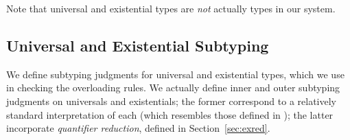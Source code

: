 \documentclass[10pt]{sigplanconf}
\newcommand{\subtypeof}{\ensuremath{<:}}
\newcommand{\ob}[1]{\ensuremath{\llbracket {#1} \rrbracket}}
\begin{document}
Note that universal and existential types 
are \emph{not} actually types in our system.

\subsection{Universal and Existential Subtyping}

We define subtyping judgments for universal and existential types,
which we use in checking the overloading rules. 
We actually define inner and outer subtyping judgments on universals and existentials; 
the former correspond to a relatively standard interpretation of each 
(which resembles those defined in \cite{bourdoncle97});
the latter incorporate \emph{quantifier reduction}, 
defined in Section~\ref{sec:exred}.
\end{document}
